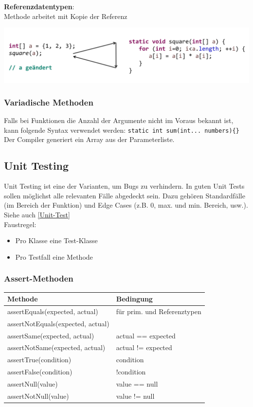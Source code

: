 \textbf{Referenzdatentypen}:\\
Methode arbeitet mit Kopie der Referenz
\begin{center}
    \includegraphics[width=0.9\columnwidth]{pictures/reference-params.png}    
\end{center}

\subsubsection{Variadische Methoden}
Falls bei Funktionen die Anzahl der Argumente nicht im Voraus bekannt ist, kann folgende
Syntax verwendet werden: \verb|static int sum(int... numbers){}|\\
Der Compiler generiert ein Array aus der Parameterliste.

\subsection{Unit Testing}
Unit Testing ist eine der Varianten, um Bugs zu verhindern. In guten Unit Tests sollen möglichst alle relevanten Fälle abgedeckt sein.
Dazu gehören Standardfälle (im Bereich der Funktion) und Edge Cases (z.B. 0, max. und min. Bereich, usw.). Siehe auch \ref{Unit-Test}\\
Faustregel:
\begin{itemize}
    \itemsep0em
    \item Pro Klasse eine Test-Klasse
    \item Pro Testfall eine Methode
\end{itemize}

\subsubsection{Assert-Methoden}
\begin{center}
    \begin{tabular}{ll}
        \rowcolor[RGB]{239,239,239} 
        \textbf{Methode} & \textbf{Bedingung} \\ \hline
        assertEquals(expected, actual) & für prim. und Referenztypen \\
        assertNotEquals(expected, actual) & \\
        assertSame(expected, actual) & actual == expected\\
        assertNotSame(expected, actual) & actual != expected\\
        assertTrue(condition) & condition\\
        assertFalse(condition) & !condition\\
        assertNull(value) & value == null\\
        assertNotNull(value) & value != null\\
    \end{tabular}
\end{center}

